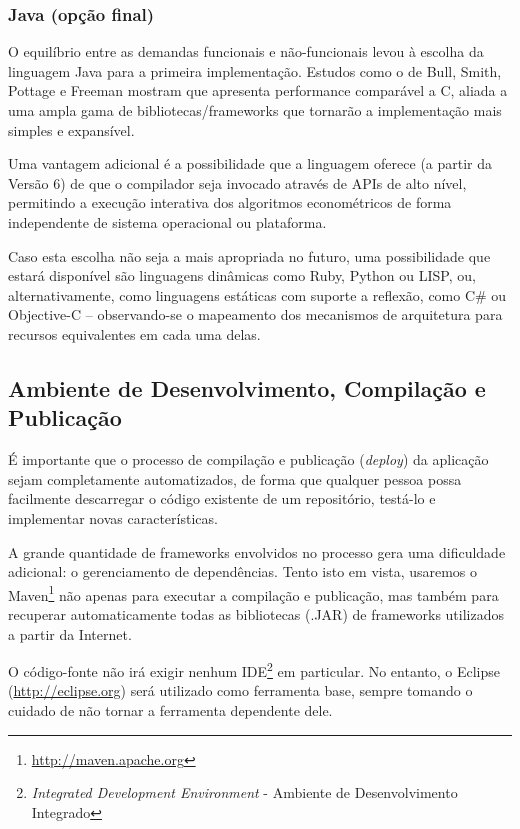 \documentclass{abnt}
\begin{document}
\subsubsection{Java (opção final)}
O equilíbrio entre as demandas funcionais e não-funcionais levou à escolha da linguagem Java para a primeira implementação. Estudos como o de Bull, Smith, Pottage e Freeman\cite{BullSmithPottageFreeman} mostram que apresenta performance comparável a C, aliada a uma ampla gama de bibliotecas/frameworks que tornarão a implementação mais simples e expansível.

Uma vantagem adicional é a possibilidade que a linguagem oferece (a partir da Versão 6) de que o compilador seja invocado através de APIs de alto nível, permitindo a execução interativa dos algoritmos econométricos de forma independente de sistema operacional ou plataforma.

Caso esta escolha não seja a mais apropriada no futuro, uma possibilidade que estará disponível são  linguagens dinâmicas como Ruby, Python ou LISP, ou, alternativamente, como linguagens estáticas com suporte a reflexão, como C\# ou Objective-C – observando-se o mapeamento dos mecanismos de arquitetura para recursos equivalentes em cada uma delas.

\subsection{Ambiente de Desenvolvimento, Compilação e Publicação}

É importante que o processo de compilação e publicação (\textit{deploy}) da aplicação sejam completamente automatizados, de forma que qualquer pessoa possa facilmente descarregar o código existente de um repositório, testá-lo e implementar novas características.

A grande quantidade de frameworks envolvidos no processo gera uma dificuldade adicional: o gerenciamento de dependências. Tento isto em vista, usaremos o Maven\footnote{\url{http://maven.apache.org}} não apenas para executar a compilação e publicação, mas também para recuperar automaticamente todas as bibliotecas (.JAR) de frameworks utilizados a partir da Internet.

O código-fonte não irá exigir nenhum IDE\footnote{\textit{Integrated Development Environment} - Ambiente de Desenvolvimento Integrado} em particular. No entanto, o Eclipse (\url{http://eclipse.org}) será utilizado como ferramenta base, sempre tomando o cuidado de não tornar a ferramenta dependente dele. 
\end{document}
